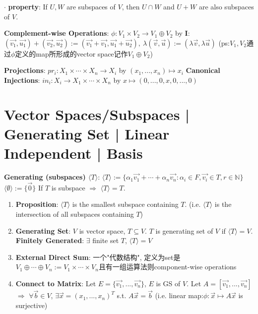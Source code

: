 \documentclass[9pt]{article}
\begin{document}
$\cdot$ \textbf{property}: {\small If $U,W$ are subspaces of $V$, then $U\cap W$ and $U + W$ are also subspaces of $V$.} 

\textbf{\small Complement-wise Operations}: {\scriptsize $\phi:V_1\times V_2\to V_1\oplus V_2$ by \textbf{I}:$(\vec{v_1},\vec{u_1})+(\vec{v_2},\vec{u_2}):=(\vec{v_1}+\vec{v_1},\vec{u_1}+\vec{u_2}), \ \lambda(\vec{v},\vec{u}):=(\lambda\vec{v},\lambda\vec{u})$ {\tiny (ps:$V_1,V_2$通过$\phi$定义的map所形成的vector space记作$V_1\oplus V_2$)}}

\textbf{Projections}: $pr_i:X_1\times\cdots\times X_n\to X_i$ by $(x_1,...,x_n)\mapsto x_i$ \quad \textbf{Canonical Injections}: $in_i:X_i\to X_1\times\cdots\times X_n$ by $x\mapsto(0,...,0,x,0,...,0)$


\section{Vector Spaces/Subspaces | Generating Set | Linear Independent | Basis} %

\textbf{Generating (subspaces) $\langle T\rangle$}: $\langle T\rangle:=\{\alpha_1\vec{v_1}+\cdots+\alpha_n\vec{v_n}:\alpha_i\in F,\vec{v_i}\in T,r\in\mathbb{N}\}$ \quad $\langle\emptyset\rangle:=\{\vec{0}\}$ \quad  If $T$ is subspace $\Rightarrow$ $\langle T\rangle=T$.

\begin{enumerate}[itemsep=-2pt, topsep=-2pt]
    \item \textbf{Proposition}: $\langle T\rangle$ is the smallest subspace containing $T$. (i.e. $\langle T \rangle$ is the intersection of all subspaces containing $T$)
    \item \textbf{Generating Set}: $V$ is vector space, $T\subseteq V$. $T$ is generating set of $V$ if $\langle T\rangle=V$. \quad \textbf{Finitely Generated}: $\exists$ finite set $T$, $\langle T\rangle=V$
    \item \textbf{External Direct Sum}: {\small 一个"代数结构", 定义为set是$V_1\oplus\cdots\oplus V_n:=V_1\times\cdots\times V_n$且有一组运算法则component-wise operations}
    \item \textbf{Connect to Matrix}: {\footnotesize Let $E=\{\vec{v_1},...,\vec{v_n}\}$, $E$ is GS of $V$. Let $A=[\vec{v_1},...,\vec{v_n}]$ $\Rightarrow$ $\forall\vec{b}\in V$, $\exists \vec{x}=(x_1,...,x_n)^T$ s.t. $A\vec{x}=\vec{b}$ (i.e. linear map:$\phi:\vec{x}\mapsto A\vec{x}$ is surjective)}
\end{enumerate}
\end{document}
